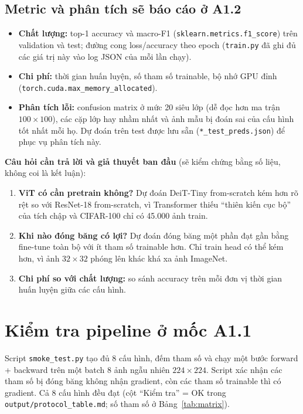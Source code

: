 \documentclass[12pt]{article}
\newcommand{\code}[1]{\texttt{#1}}
\newcommand{\st}[1]{\textbf{#1}}
\begin{document}
\subsection{Metric và phân tích sẽ báo cáo ở A1.2}
\begin{itemize}
  \item \st{Chất lượng:} top-1 accuracy và macro-F1 (\code{sklearn.metrics.f1\_score}) trên validation và test;
        đường cong loss/accuracy theo epoch (\code{train.py} đã ghi đủ các giá trị này vào log JSON của mỗi lần chạy).
  \item \st{Chi phí:} thời gian huấn luyện, số tham số trainable, bộ nhớ GPU đỉnh (\code{torch.cuda.max\_memory\_allocated}).
  \item \st{Phân tích lỗi:} confusion matrix ở mức 20 siêu lớp (dễ đọc hơn ma trận $100\times100$), các cặp lớp hay nhầm
        nhất và ảnh mẫu bị đoán sai của cấu hình tốt nhất mỗi họ. Dự đoán trên test được lưu sẵn
        (\code{*\_test\_preds.json}) để phục vụ phân tích này.
\end{itemize}

\textbf{Câu hỏi cần trả lời và giả thuyết ban đầu} (sẽ kiểm chứng bằng số liệu, không coi là kết luận):
\begin{enumerate}
  \item \st{ViT có cần pretrain không?} Dự đoán DeiT-Tiny from-scratch kém hơn rõ rệt so với ResNet-18 from-scratch,
        vì Transformer thiếu ``thiên kiến cục bộ'' của tích chập và CIFAR-100 chỉ có 45.000 ảnh train.
  \item \st{Khi nào đóng băng có lợi?} Dự đoán đóng băng một phần đạt gần bằng fine-tune toàn bộ với ít tham số trainable
        hơn. Chỉ train head có thể kém hơn, vì ảnh $32\times32$ phóng lên khác khá xa ảnh ImageNet.
  \item \st{Chi phí so với chất lượng:} so sánh accuracy trên mỗi đơn vị thời gian huấn luyện giữa các cấu hình.
\end{enumerate}

\section{Kiểm tra pipeline ở mốc A1.1}
Script \code{smoke\_test.py} tạo đủ 8 cấu hình, đếm tham số và chạy một bước forward + backward trên một batch 8 ảnh
ngẫu nhiên $224\times224$. Script xác nhận các tham số bị đóng băng không nhận gradient, còn các tham số trainable thì có
gradient. Cả 8 cấu hình đều đạt (cột ``Kiểm tra'' = OK trong \code{output/protocol\_table.md}; số tham số ở
Bảng~\ref{tab:matrix}).
\end{document}
